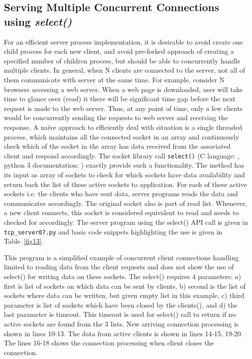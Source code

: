 \begin{multicols}{2}

\section{Serving Multiple Concurrent Connections using \textit{select()}}

For an efficient server process implementation, it is desirable to avoid create one child process for each new client, and avoid pre-forked approach of creating a specified number of children process, but should be able to concurrently handle multiple clients. In general, when N clients are connected to the server, not all of them communicate with server at the same time. For example, consider N browsers accessing a web server. When a web page is downloaded, user will take time to glance over (read) it there will be significant time gap before the next request is made to the web server. Thus, at any point of time, only a few clients would be concurrently sending the requests to web server and receiving the response. A naïve approach to efficiently deal with situation is a single threaded process, which maintains all the connected socket in an array and continuously check which of the socket in the array has data received from the associated client and respond accordingly. The socket library call \texttt{select()} (C language: \cite{art1-key14}, python 3 documentation: \cite{art1-key15}) exactly provide such a functionality. The method has its input as array of sockets to check for which sockets have data availability and return back the list of these active sockets to application. For each of these active sockets i.e. the clients who have sent data, server programs reads the data and communicates accordingly. The original socket also is part of read list. Whenever, a new client connects, this socket is considered equivalent to read and needs to checked for accordingly. The server program using the select() API call is given in \texttt{tcp\_server07.py} and basic code snippets highlighting the use is given in Table~\ref{fig13}.

This program is a simplified example of concurrent client connections handling limited to reading data from the client requests and does not show the use of select() for writing data on these sockets. The select() requires 4 parameters: a) first is list of sockets on which data can be sent by clients, b) second is the list of sockets where data can be written, but given empty list in this example, c) third parameter is list of sockets which have been closed by the clients(), and d) the last parameter is timeout. This timeout is used for select() call to return if no active sockets are found from the 3 lists. New arriving connection processing is shown in lines 10-13. The data from active clients is shown in lines 14-15, 19-20. The lines 16-18 shows the connection processing when client closes the connection.


\end{multicols}
